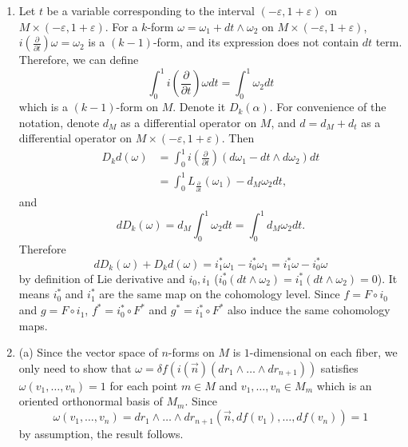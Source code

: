 \begin{enumerate}
(b) $\sigma$ in Exercise 16(b) satisfies the condition.

(c) Since $H_{2}(D ; \mathbb{R})=0$ and $0 \neq[\sigma] \in H_{2}(M ; \mathbb{R})$.
\item Let $t$ be a variable corresponding to the interval $(-\varepsilon, 1+\varepsilon)$ on $M \times(-\varepsilon, 1+\varepsilon)$. 
For a $k$-form $\omega=\omega_{1}+d t \wedge \omega_{2}$ on $M \times(-\varepsilon, 1+\varepsilon)$, 
$i\left(\frac{\partial}{\partial t}\right) \omega=\omega_{2}$ is a $(k-1)$-form, and its expression does not contain $d t$ term. 
Therefore, we can define
\[\int_{0}^{1} i\left(\frac{\partial}{\partial t}\right) \omega d t=\int_{0}^{1} \omega_{2} d t\]
which is a $(k-1)$-form on $M$. Denote it $D_{k}(\alpha)$. 
For convenience of the notation, denote $d_{M}$ as a differential operator on $M$, 
and $d=d_{M}+d_{t}$ as a differential operator on $M \times(-\varepsilon, 1+\varepsilon)$. Then
\begin{align*}
D_{k} d(\omega)&=\int_{0}^{1} i\left(\frac{\partial}{\partial t}\right)(d \omega_{1}-d t \wedge d \omega_{2}) d t\\
&=\int_{0}^{1} L_{\frac{\partial}{\partial t}}(\omega_{1})-d_{M} \omega_{2} d t,
\end{align*}
and \[d D_{k}(\omega)=d_{M} \int_{0}^{1} \omega_{2} d t=\int_{0}^{1} d_{M} \omega_{2} d t.\]
Therefore \[d D_{k}(\omega)+D_{k} d(\omega)=i_{1}^{*} \omega_{1}-i_{0}^{*} \omega_{1}=i_{1}^{*} \omega-i_{0}^{*} \omega\]
by definition of Lie derivative and $i_{0}, i_{1}$ 
($i_{0}^{*}(d t \wedge \omega_{2})=i_{1}^{*}(d t \wedge \omega_{2})=0$). 
It means $i_{0}^{*}$ and $i_{1}^{*}$ are the same map on the cohomology level. 
Since $f=F \circ i_{0}$ and $g=F \circ i_{1}$, $f^{*}=i_{0}^{*} \circ F^{*}$ and $g^{*}=i_{1}^{*} \circ F^{*}$ also induce the same cohomology maps.
\item (a) Since the vector space of $n$-forms on $M$ is $1$-dimensional on each fiber, 
we only need to show that $\omega=\delta f(i(\vec{n})(d r_{1} \wedge \ldots \wedge d r_{n+1}))$ 
satisfies $\omega(v_{1}, \ldots, v_{n})=1$ for each point $m \in M$ 
and $v_{1}, \ldots, v_{n} \in M_{m}$ which is an oriented orthonormal basis of $M_{m}$. 
Since
\[\omega(v_{1}, \ldots, v_{n})=d r_{1} \wedge \ldots \wedge d r_{n+1}(\vec{n}, d f(v_{1}), \ldots, d f(v_{n}))=1\]
by assumption, the result follows.


\end{enumerate}
